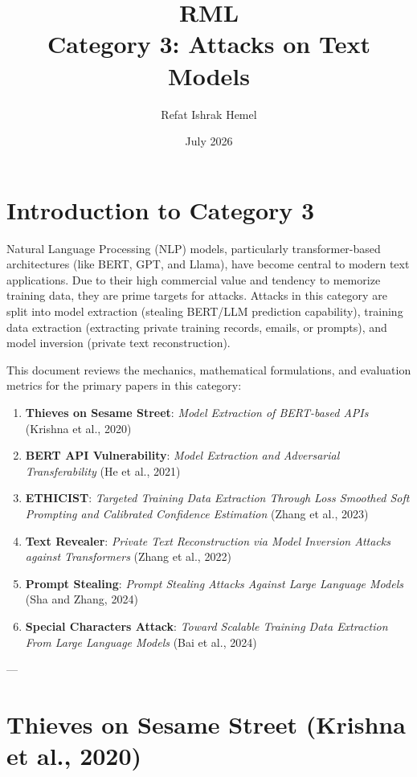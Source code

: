 \documentclass{article}
\title{RML\\
\large Category 3: Attacks on Text Models}
\author{Refat Ishrak Hemel}
\date{July 2026}
\begin{document}
\maketitle

\section{Introduction to Category 3}
Natural Language Processing (NLP) models, particularly transformer-based architectures (like BERT, GPT, and Llama), have become central to modern text applications. Due to their high commercial value and tendency to memorize training data, they are prime targets for attacks. Attacks in this category are split into model extraction (stealing BERT/LLM prediction capability), training data extraction (extracting private training records, emails, or prompts), and model inversion (private text reconstruction).

This document reviews the mechanics, mathematical formulations, and evaluation metrics for the primary papers in this category:
\begin{enumerate}
    \item \textbf{Thieves on Sesame Street}: \textit{Model Extraction of BERT-based APIs} (Krishna et al., 2020)
    \item \textbf{BERT API Vulnerability}: \textit{Model Extraction and Adversarial Transferability} (He et al., 2021)
    \item \textbf{ETHICIST}: \textit{Targeted Training Data Extraction Through Loss Smoothed Soft Prompting and Calibrated Confidence Estimation} (Zhang et al., 2023)
    \item \textbf{Text Revealer}: \textit{Private Text Reconstruction via Model Inversion Attacks against Transformers} (Zhang et al., 2022)
    \item \textbf{Prompt Stealing}: \textit{Prompt Stealing Attacks Against Large Language Models} (Sha and Zhang, 2024)
    \item \textbf{Special Characters Attack}: \textit{Toward Scalable Training Data Extraction From Large Language Models} (Bai et al., 2024)
\end{enumerate}

---

\section{Thieves on Sesame Street (Krishna et al., 2020)}
\end{document}
